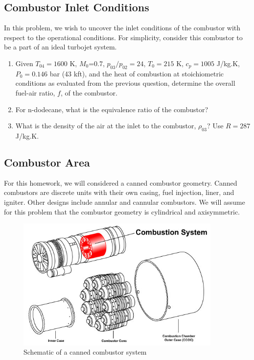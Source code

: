 \documentclass[11pt]{article}
\begin{document}
\subsection{Combustor Inlet Conditions}
In this problem, we wish to uncover the inlet conditions of the combustor with respect to the operational conditions. For simplicity, consider this combustor to be a part of an ideal turbojet system. 
\begin{enumerate}
	\item
        Given $T_{04}=1600$ K, $M_0$=0.7, $p_{03}/p_{02}=24$,  $T_0=215$ K, $c_p=1005$ J/kg.K, $P_0=0.146$ bar (43 kft), and the heat of combustion at stoichiometric conditions as evaluated from the previous question, determine the overall fuel-air ratio, $f$, of the combustor.
    \item
    	For n-dodecane, what is the equivalence ratio of the combustor? 
    \item
    	What is the density of the air at the inlet to the combustor, $\rho_{03}$? Use $R=287$ J/kg.K.
\end{enumerate}
\subsection{Combustor Area}
For this homework, we will considered a canned combustor geometry. Canned combustors are discrete units with their own casing, fuel injection, liner, and igniter. Other designs include annular and cannular combustors. We will assume for this problem that the combustor geometry is cylindrical and axisymmetric. 

\begin{figure}[!ht!]
	\begin{center}
		\includegraphics[width=0.9\textwidth]{cannedCombustor.jpg}
		\caption{\label{FIG_CC} Schematic of a canned combustor system}
	\end{center}
\end{figure}
\end{document}
